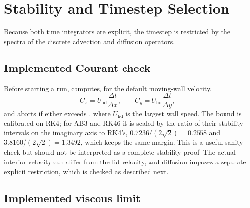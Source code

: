 \documentclass[11pt,a4paper]{article}
\newcommand{\dt}{\Delta t}
\newcommand{\dx}{\Delta x}
\newcommand{\dy}{\Delta y}
\newcommand{\code}[1]{\texttt{\detokenize{#1}}}
\begin{document}
\section{Stability and Timestep Selection}
\label{sec:stability}

Because both time integrators are explicit, the timestep is restricted by the spectra of the discrete advection and diffusion operators.

\subsection{Implemented Courant check}

Before starting a run, \code{main.c} computes, for the default moving-wall velocity,
\begin{equation}
C_x=U_{\mathrm{lid}}\frac{\dt}{\dx},
\qquad
C_y=U_{\mathrm{lid}}\frac{\dt}{\dy},
\end{equation}
and aborts if either exceeds \code{max_co = 1}, where $U_{\mathrm{lid}}$ is the largest wall speed.  The bound is calibrated on RK4; for AB3 and RK46 it is scaled by the ratio of their stability intervals on the imaginary axis to RK4's, $0.7236/(2\sqrt2)=0.2558$ and $3.8160/(2\sqrt2)=1.3492$, which keeps the same margin.  This is a useful sanity check but should not be interpreted as a complete stability proof.  The actual interior velocity can differ from the lid velocity, and diffusion imposes a separate explicit restriction, which is checked as described next.

\subsection{Implemented viscous limit}
\end{document}
